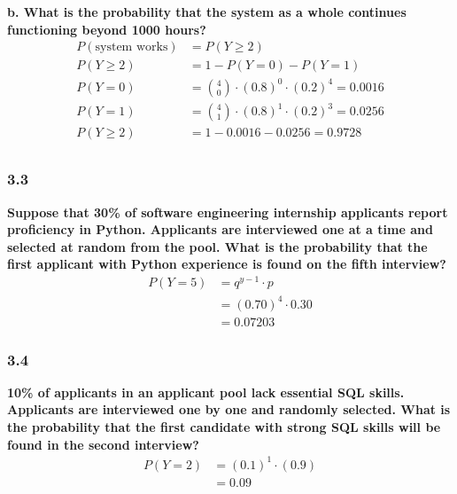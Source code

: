 \documentclass[
	a4paper, %
	10pt, %
	unnumberedsections, %
	twoside, %
]{LTJournalArticle}
\begin{document}
\textbf{b. What is the probability that the system as a whole continues functioning beyond 1000 hours?} \\
\begin{equation*}
    \begin{aligned}
        P(\text{system works}) &= P(Y \ge 2) \\ 
        P(Y \ge 2) &= 1 - P(Y = 0) - P(Y = 1) \\
        P(Y = 0) &= \binom{4}{0} \cdot (0.8)^0 \cdot (0.2)^4 = 0.0016 \\ 
        P(Y = 1) &= \binom{4}{1} \cdot (0.8)^1 \cdot (0.2)^3 = 0.0256 \\
        P(Y \ge 2) &= 1 - 0.0016 - 0.0256 = 0.9728 \\
    \end{aligned}
\end{equation*}
\vspace*{1pt}\noindent
\subsubsection{3.3}
\textbf{Suppose that 30\% of software engineering internship applicants report proficiency in Python. Applicants are interviewed one at a time and selected at random from the pool. What is the probability that the first applicant with Python experience is found on the fifth interview?} \\
\begin{equation*}
    \begin{aligned}
        P(Y = 5) &= q^{y - 1} \cdot p \\
        &= (0.70)^4 \cdot 0.30 \\
        &= 0.07203
    \end{aligned}
\end{equation*}
\vspace*{1pt}\noindent
\subsubsection{3.4}
\textbf{10\% of applicants in an applicant pool lack essential SQL skills. Applicants are interviewed one by one and randomly selected. What is the probability that the first candidate with strong SQL skills will be found in the second interview?}
\begin{equation*}
    \begin{aligned}
        P(Y = 2) &= (0.1)^1 \cdot (0.9) \\
        &= 0.09
    \end{aligned}
\end{equation*}
\vspace*{100pt}\noindent
\end{document}
